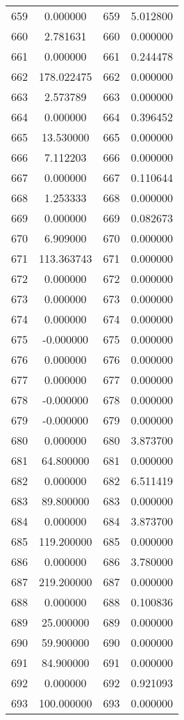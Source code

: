 \documentclass[12pt]{article}
\begin{document}
\begin{longtable}{@{}cccc@{}}
659 & 0.000000 & 659 & 5.012800 \\
660 & 2.781631 & 660 & 0.000000 \\
661 & 0.000000 & 661 & 0.244478 \\
662 & 178.022475 & 662 & 0.000000 \\
663 & 2.573789 & 663 & 0.000000 \\
664 & 0.000000 & 664 & 0.396452 \\
665 & 13.530000 & 665 & 0.000000 \\
666 & 7.112203 & 666 & 0.000000 \\
667 & 0.000000 & 667 & 0.110644 \\
668 & 1.253333 & 668 & 0.000000 \\
669 & 0.000000 & 669 & 0.082673 \\
670 & 6.909000 & 670 & 0.000000 \\
671 & 113.363743 & 671 & 0.000000 \\
672 & 0.000000 & 672 & 0.000000 \\
673 & 0.000000 & 673 & 0.000000 \\
674 & 0.000000 & 674 & 0.000000 \\
675 & -0.000000 & 675 & 0.000000 \\
676 & 0.000000 & 676 & 0.000000 \\
677 & 0.000000 & 677 & 0.000000 \\
678 & -0.000000 & 678 & 0.000000 \\
679 & -0.000000 & 679 & 0.000000 \\
680 & 0.000000 & 680 & 3.873700 \\
681 & 64.800000 & 681 & 0.000000 \\
682 & 0.000000 & 682 & 6.511419 \\
683 & 89.800000 & 683 & 0.000000 \\
684 & 0.000000 & 684 & 3.873700 \\
685 & 119.200000 & 685 & 0.000000 \\
686 & 0.000000 & 686 & 3.780000 \\
687 & 219.200000 & 687 & 0.000000 \\
688 & 0.000000 & 688 & 0.100836 \\
689 & 25.000000 & 689 & 0.000000 \\
690 & 59.900000 & 690 & 0.000000 \\
691 & 84.900000 & 691 & 0.000000 \\
692 & 0.000000 & 692 & 0.921093 \\
693 & 100.000000 & 693 & 0.000000 \\

\end{longtable}
\end{document}
